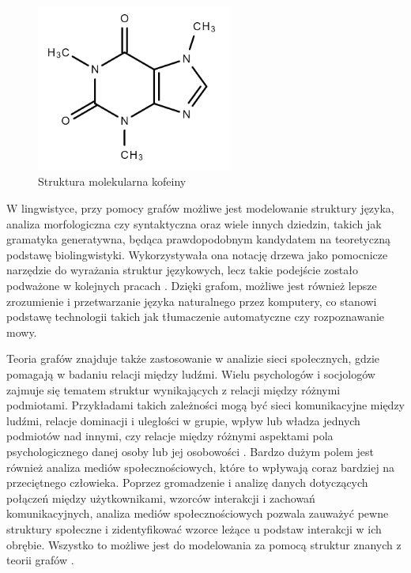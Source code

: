 \begin{figure}[ht]
	\centering
	\includegraphics[height=5.5cm]{partials/images/intro_chem.png}
	\caption{Struktura molekularna kofeiny}
    \label{Fig:intro-4}
\end{figure}

W lingwistyce, przy pomocy grafów możliwe jest modelowanie struktury języka, analiza morfologiczna czy syntaktyczna oraz wiele innych dziedzin,
takich jak gramatyka generatywna, będąca prawdopodobnym kandydatem na teoretyczną podstawę biolingwistyki.
Wykorzystywała ona notację drzewa jako pomocnicze narzędzie do wyrażania struktur językowych,
lecz takie podejście zostało podważone w kolejnych pracach \cite{Arikawa2019}.
Dzięki grafom, możliwe jest również lepsze zrozumienie i przetwarzanie języka naturalnego przez komputery,
co stanowi podstawę technologii takich jak tłumaczenie automatyczne czy rozpoznawanie mowy.

Teoria grafów znajduje także zastosowanie w analizie sieci społecznych, gdzie pomagają w badaniu relacji między ludźmi.
Wielu psychologów i socjologów zajmuje się tematem struktur wynikających z relacji między różnymi podmiotami.
Przykładami takich zależności mogą być sieci komunikacyjne między ludźmi, relacje dominacji i uległości w grupie,
wpływ lub władza jednych podmiotów nad innymi, czy relacje między różnymi aspektami pola psychologicznego danej osoby lub jej osobowości \cite{Harary1953}.
Bardzo dużym polem jest również analiza mediów społecznościowych, które to wpływają coraz bardziej na przeciętnego człowieka.
Poprzez gromadzenie i analizę danych dotyczących połączeń między użytkownikami, wzorców interakcji i zachowań komunikacyjnych,
analiza mediów społecznościowych pozwala zauważyć pewne struktury społeczne i zidentyfikować wzorce leżące u podstaw interakcji w ich obrębie.
Wszystko to możliwe jest do modelowania za pomocą struktur znanych z teorii grafów \cite{Umami2024}.

